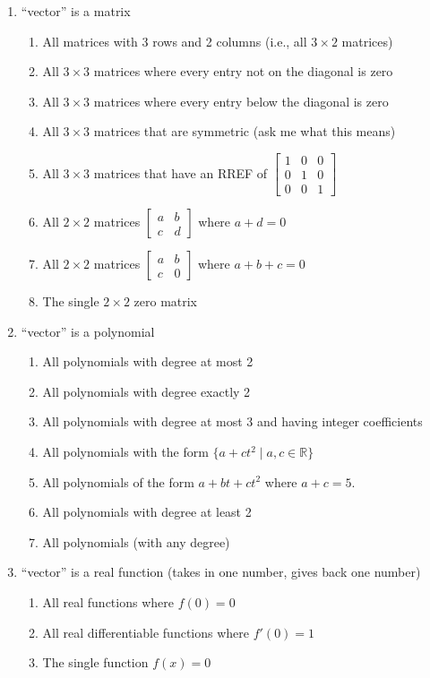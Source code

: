 \documentclass[11pt]{article}
\begin{document}
\begin{enumerate}
\item ``vector'' is a matrix
  \begin{enumerate}
  \item All matrices with 3 rows and 2 columns (i.e., all $3\times 2$ matrices)
  \item All $3\times 3$ matrices where every entry not on the diagonal is zero
  \item All $3\times 3$ matrices where every entry below the diagonal is zero
  \item All $3\times 3$ matrices that are symmetric (ask me what this means)
  \item All $3\times 3$ matrices that have an RREF of $\begin{bmatrix}1&0&0\\0&1&0\\0&0&1\end{bmatrix}$
  \item All $2\times 2$ matrices $\begin{bmatrix}a&b\\c&d\end{bmatrix}$ where $a+d=0$
  \item All $2\times 2$ matrices $\begin{bmatrix}a&b\\c&0\end{bmatrix}$ where $a+b+c=0$
  \item The single $2\times 2$ zero matrix
\end{enumerate}
\item ``vector'' is a polynomial
  \begin{enumerate}
  \item All polynomials with degree at most 2
  \item All polynomials with degree exactly 2
  \item All polynomials with degree at most 3 and having integer coefficients
  \item All polynomials with the form $\{a+ct^2\mid a,c\in\mathbb{R}\}$
  \item All polynomials of the form $a+bt+ct^2$ where $a+c=5$.
  \item All polynomials with degree at least 2
  \item All polynomials (with any degree)
  \end{enumerate}
\item ``vector'' is a real function (takes in one number, gives back one number)
  \begin{enumerate}
  \item All real functions where $f(0)=0$
  \item All real differentiable functions where $f'(0)=1$
  \item The single function $f(x)=0$
\end{enumerate}
\end{enumerate}
\end{document}
